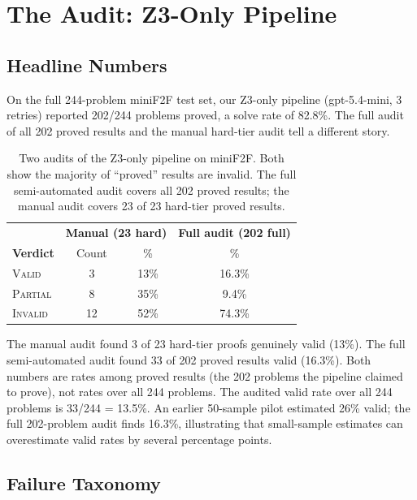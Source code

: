 \documentclass[11pt]{article}
\begin{document}
\section{The Audit: Z3-Only Pipeline}\label{sec:z3audit}

\subsection{Headline Numbers}

On the full 244-problem miniF2F test set, our Z3-only pipeline (gpt-5.4-mini, 3 retries) reported 202/244 problems proved, a solve rate of 82.8\%. The full audit of all 202 proved results and the manual hard-tier audit tell a different story.

\begin{table}[t]
\centering
\caption{Two audits of the Z3-only pipeline on miniF2F. Both show the majority of ``proved'' results are invalid. The full semi-automated audit covers all 202 proved results; the manual audit covers 23 of 23 hard-tier proved results.}
\label{tab:z3audits}
\small
\begin{tabular}{@{}lccc@{}}
\toprule
 & \multicolumn{2}{c}{\textbf{Manual (23 hard)}} & \textbf{Full audit (202 full)} \\
\textbf{Verdict} & Count & \% & \% \\
\midrule
\textsc{Valid} & 3 & 13\% & 16.3\% \\
\textsc{Partial} & 8 & 35\% & 9.4\% \\
\textsc{Invalid} & 12 & 52\% & 74.3\% \\
\bottomrule
\end{tabular}
\end{table}

The manual audit found 3 of 23 hard-tier proofs genuinely valid (13\%). The full semi-automated audit found 33 of 202 proved results valid (16.3\%). Both numbers are rates among proved results (the 202 problems the pipeline claimed to prove), not rates over all 244 problems. The audited valid rate over all 244 problems is 33/244 = 13.5\%. An earlier 50-sample pilot estimated 26\% valid; the full 202-problem audit finds 16.3\%, illustrating that small-sample estimates can overestimate valid rates by several percentage points.

\subsection{Failure Taxonomy}
\end{document}
